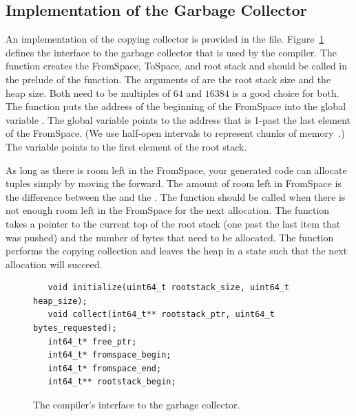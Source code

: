 \documentclass[7x10,nocrop]{TimesAPriori_MIT}%
\begin{document}
\subsection{Implementation of the Garbage Collector}
\label{sec:organize-gz}

An implementation of the copying collector is provided in the
 file. Figure~\ref{fig:gc-header} defines the
interface to the garbage collector that is used by the compiler. The
 function creates the FromSpace, ToSpace, and root
stack and should be called in the prelude of the 
function. The arguments of  are the root stack size
and the heap size. Both need to be multiples of $64$ and $16384$ is a
good choice for both.  The  function puts the address
of the beginning of the FromSpace into the global variable
. The global variable  points to
the address that is 1-past the last element of the FromSpace. (We use
half-open intervals to represent chunks of
memory~\citep{Dijkstra:1982aa}.)  The  variable
points to the first element of the root stack.

As long as there is room left in the FromSpace, your generated code
can allocate tuples simply by moving the  forward.
%
The amount of room left in FromSpace is the difference between the
 and the .  The 
function should be called when there is not enough room left in the
FromSpace for the next allocation.  The  function takes
a pointer to the current top of the root stack (one past the last item
that was pushed) and the number of bytes that need to be
allocated. The  function performs the copying collection
and leaves the heap in a state such that the next allocation will
succeed.

\begin{figure}[tbp]
\begin{lstlisting}
   void initialize(uint64_t rootstack_size, uint64_t heap_size);
   void collect(int64_t** rootstack_ptr, uint64_t bytes_requested);
   int64_t* free_ptr;
   int64_t* fromspace_begin;
   int64_t* fromspace_end;
   int64_t** rootstack_begin;
\end{lstlisting}
\caption{The compiler's interface to the garbage collector.}
\label{fig:gc-header}
\end{figure}
\end{document}
